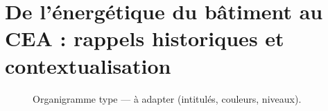 \part{De l'énergétique du bâtiment au CEA : rappels historiques et contextualisation}
\begin{figure}[H]
    \centering
    
    \caption{Organigramme type — à adapter (intitulés, couleurs, niveaux).}
    \label{fig:organigramme-type}
\end{figure}